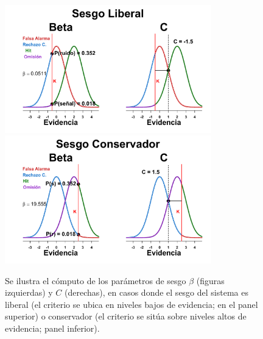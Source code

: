 \begin{itemize}
\begin{figure}[th]
\centering
\includegraphics[width=0.8\textwidth]{Figures/Graficador_Sesgo_LiberalR}\\
\includegraphics[width=0.8\textwidth]{Figures/Graficador_Sesgo_ConservadorR}\\
\caption[Estimación paramétrica: Sesgos $\beta$ y $c$]{Se ilustra el cómputo de los parámetros de sesgo $\beta$ (figuras izquierdas) y $C$ (derechas), en casos donde el sesgo del sistema es liberal (el criterio se ubica en niveles bajos de evidencia; en el panel superior) o conservador (el criterio se sitúa sobre niveles altos de evidencia; panel inferior).}
\label{fig:Graf_Sesgo}
\end{figure}
\end{itemize}   %

